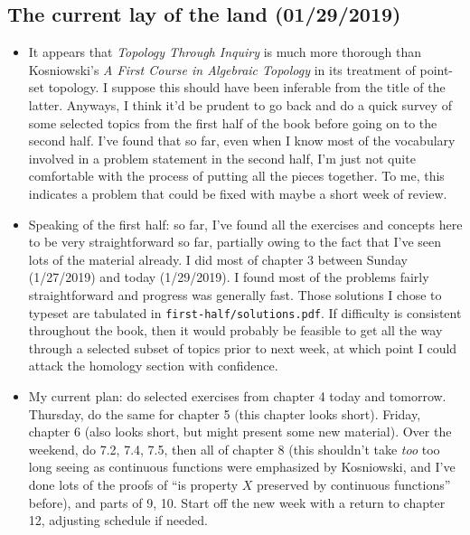 \documentclass{fkbook}
\begin{document}
\subsection*{The current lay of the land (01/29/2019)}
\begin{itemize}
  \item It appears that \emph{Topology Through Inquiry} is much more thorough
    than Kosniowski's \emph{A First Course in Algebraic Topology} in its
    treatment of point-set topology. I suppose this should have been inferable
    from the title of the latter. Anyways, I think it'd be prudent to go back
    and do a quick survey of some selected topics from the first half of the
    book before going on to the second half. I've found that so far, even when
    I know most of the vocabulary involved in a problem statement in the second
    half, I'm just not quite comfortable with the process of putting all the
    pieces together. To me, this indicates a problem that could be fixed with
    maybe a short week of review.

  \item Speaking of the first half: so far, I've found all the exercises and
    concepts here to be very straightforward so far, partially owing to the fact
    that I've seen lots of the material already. I did most of chapter 3 between
    Sunday (1/27/2019) and today (1/29/2019). I found most of the problems
    fairly straightforward and progress was generally fast. Those solutions I
    chose to typeset are tabulated in \texttt{first-half/solutions.pdf}. If
    difficulty is consistent throughout the book, then it would probably be
    feasible to get all the way through a selected subset of topics prior to
    next week, at which point I could attack the homology section with
    confidence.

  \item My current plan: do selected exercises from chapter 4 today and
    tomorrow. Thursday, do the same for chapter 5 (this chapter looks short).
    Friday, chapter 6 (also looks short, but might present some new material).
    Over the weekend, do 7.2, 7.4, 7.5, then all of chapter 8 (this shouldn't
    take \emph{too} too long seeing as continuous functions were emphasized by
    Kosniowski, and I've done lots of the proofs of ``is property $X$ preserved
    by continuous functions'' before), and parts of 9, 10. Start off the new
    week with a return to chapter 12, adjusting schedule if needed.
\end{itemize}
\end{document}
